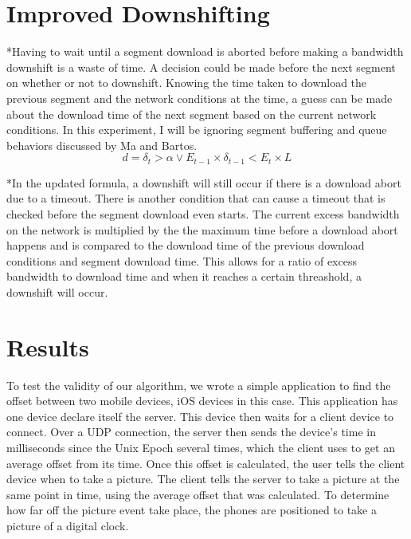 \documentclass[10pt]{IEEEtran} %
\begin{document}
\section{Improved Downshifting}

*Having to wait until a segment download is aborted before making a bandwidth
downshift is a waste of time. A decision could be made before the next segment 
on whether or not to downshift. Knowing the time taken to download the previous
segment and the network conditions at the time, a guess can be made about the 
download time of the next segment based on the current network conditions. 
In this experiment, I will be ignoring segment buffering and queue behaviors 
discussed by Ma and Bartos.
\begin {equation}
    d = \delta_t > \alpha \vee E_{t - 1} \times \delta_{t - 1} < E_{t} \times L
\end {equation}

*In the updated formula, a downshift will still occur if there is a download
abort due to a timeout. There is another condition that can cause a timeout that
is checked before the segment download even starts. The current excess bandwidth
on the network is multiplied by the the maximum time before a download abort
happens and is compared to the download time of the previous download conditions
and segment download time. This allows for a ratio of excess bandwidth to 
download time and when it reaches a certain threashold, a downshift will occur.

\section{Results}

To test the validity of our algorithm, we wrote a simple application to find 
the offset between two mobile devices, iOS devices in this case. This
application has one device declare itself the server. This device then waits for
a client device to connect. Over a UDP connection, the server then sends the
device's time in milliseconds since the Unix Epoch several times, which the
client uses to get an average offset from its time. Once this offset is
calculated, the user tells the client device when to take a picture. The client
tells the server to take a picture at the same point in time, using the average
offset that was calculated. To determine how far off the picture event take
place, the phones are positioned to take a picture of a digital clock.

\end{document}
